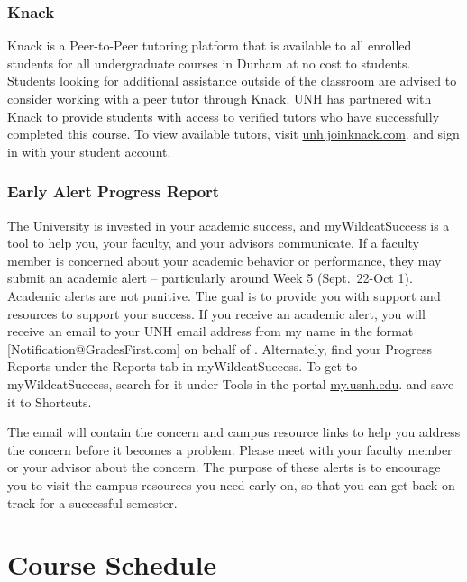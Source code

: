 \documentclass[
  letterpaper,
  DIV=11,
  numbers=noendperiod]{scrreprt}
\begin{document}
\hypertarget{knack}{%
\subsection*{Knack}\label{knack}}

Knack is a Peer-to-Peer tutoring platform that is available to all
enrolled students for all undergraduate courses in Durham at no cost to
students. Students looking for additional assistance outside of the
classroom are advised to consider working with a peer tutor through
Knack. UNH has partnered with Knack to provide students with access to
verified tutors who have successfully completed this course. To view
available tutors, visit \url{unh.joinknack.com}. and sign in with your
student account.

\hypertarget{early-alert-progress-report}{%
\subsection*{Early Alert Progress
Report}\label{early-alert-progress-report}}

The University is invested in your academic success, and
myWildcatSuccess is a tool to help you, your faculty, and your advisors
communicate. If a faculty member is concerned about your academic
behavior or performance, they may submit an academic alert --
particularly around Week 5 (Sept.~22-Oct 1). Academic alerts are not
punitive. The goal is to provide you with support and resources to
support your success. If you receive an academic alert, you will receive
an email to your UNH email address from my name in the format
{[}Notification@GradesFirst.com{]} on behalf of . Alternately, find your
Progress Reports under the Reports tab in myWildcatSuccess. To get to
myWildcatSuccess, search for it under Tools in the portal
\href{https://my.usnh.edu/dashboard}{my.usnh.edu}. and save it to
Shortcuts.

The email will contain the concern and campus resource links to help you
address the concern before it becomes a problem. Please meet with your
faculty member or your advisor about the concern. The purpose of these
alerts is to encourage you to visit the campus resources you need early
on, so that you can get back on track for a successful semester.


\hypertarget{course-schedule}{%
\chapter*{Course Schedule}\label{course-schedule}}
\end{document}
